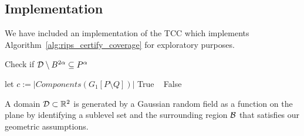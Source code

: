 \subsection{Implementation}

We have included an implementation of the TCC which implements Algorithm~\ref{alg:rips_certify_coverage} for exploratory purposes.

\begin{center}
\begin{minipage}{0.6\textwidth}
    \begin{algorithm}[H]
    	\caption{Check if $\D\setminus B^{2\alpha}\subseteq \kcoverage{P_k^\alpha}\nokcoverage{P^\alpha}$}
    	\label{alg:rips_certify_coverage}
    	\begin{algorithmic}[1]
    			\State let $c := |Components(G_1[P\setminus Q])|$
            \Return True
            \Else ~
            \Return False
    			\EndIf
    		\EndProcedure
    	\end{algorithmic}
    \end{algorithm}
\end{minipage}
\end{center}

A domain $\D\subset\R^2$ is generated by a Gaussian random field as a function on the plane by identifying a sublevel set and the surrounding region $\B$ that satisfies our geometric assumptions.


